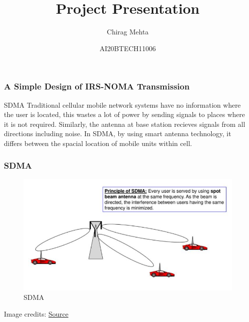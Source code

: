 \documentclass{beamer}
\title{Project Presentation}
\author{Chirag Mehta}
\date{AI20BTECH11006}
\begin{document}
\begin{frame}
\titlepage
\end{frame}
\begin{frame}
\frametitle{A Simple Design of IRS-NOMA Transmission}
\begin{block}{SDMA}
Traditional cellular mobile network systems have no information where the user is located, this wastes a lot of power by sending signals to places where it is not required. Similarly, the antenna at base station recieves signals from all directions including noise. In SDMA, by using smart antenna technology, it differs between the spacial location of mobile units within cell.
\end{block}
\end{frame}
\begin{frame}
\frametitle{SDMA}
\begin{figure}[H]
\centering
\includegraphics[width=.75\linewidth]{figure/SDMA}
\caption{SDMA}
\label{plot:SDMA}
\end{figure}
Image credits: \href{https://slideplayer.com/slide/13883994/}{Source}
\end{frame}
\end{document}

